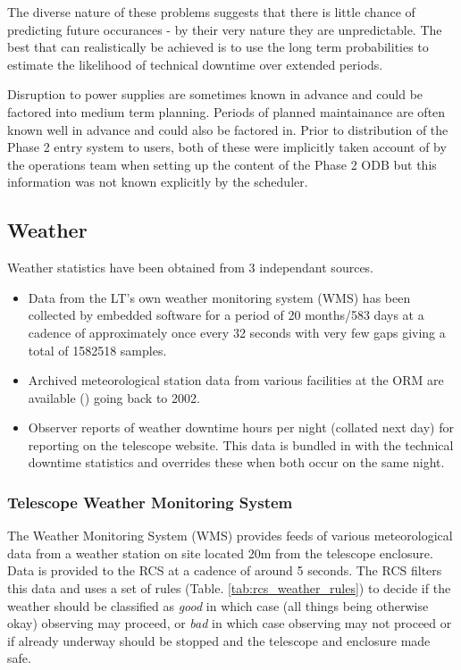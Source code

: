 The diverse nature of these problems suggests that there is little chance of predicting future occurances - by their very nature they are unpredictable. The best that can realistically be achieved is to use the long term probabilities to estimate the likelihood of technical downtime over extended periods. 

Disruption to power supplies are sometimes known in advance and could be factored into medium term planning. Periods of planned maintainance are often known well in advance and could also be factored in. Prior to distribution of the Phase 2 entry system to users, both of these were implicitly taken account of by the operations team when setting up the content of the Phase 2 ODB but this information was not known explicitly by the scheduler.

\subsection{Weather}  
Weather statistics have been obtained from 3 independant sources.
\begin{itemize}
\item Data from the LT's own weather monitoring system (WMS) has been collected by embedded software for a period of 20 months/583 days at a cadence of approximately once every 32 seconds with very few gaps giving a total of 1582518 samples.%

\item Archived meteorological station data from various facilities at the ORM are available (\cite{sorensen02cat}) going back to 2002.

\item Observer reports of weather downtime hours per night (collated next day) for reporting on the telescope website. This data is bundled in with the technical downtime statistics and overrides these when both occur on the same night.
\end{itemize}


\subsubsection{Telescope Weather Monitoring System}%
 The Weather Monitoring System (WMS) provides feeds of various meteorological data from a weather station on site located 20m from the telescope enclosure.  Data is provided to the RCS at a cadence of around 5 seconds. The RCS filters this data and uses a set of rules (Table. \ref{tab:rcs_weather_rules}) to decide if the weather should be classified as \emph{good} in which case (all things being otherwise okay) observing may proceed, or \emph{bad} in which case observing may not proceed or if already underway should be stopped and the telescope and enclosure made safe.

